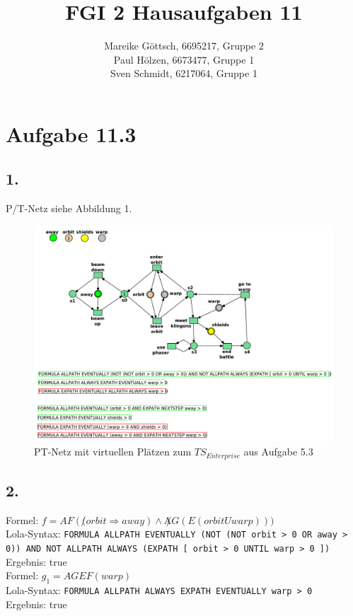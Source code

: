\documentclass[12pt, paper=a4]{article}
\author{Mareike G\"ottsch, 6695217, Gruppe 2\\Paul H\"olzen, 6673477, Gruppe 1\\Sven Schmidt, 6217064, Gruppe 1}
\title{FGI 2 Hausaufgaben 11}
\begin{document}
\maketitle

\section*{Aufgabe 11.3}
\subsection*{1.}
P/T-Netz siehe Abbildung 1.\\

\begin{figure}[h!]
\centering
\includegraphics[scale=0.7]{EnterprisePT.pdf}
\caption{PT-Netz mit virtuellen Plätzen zum $TS_{Enterprise}$ aus Aufgabe 5.3}
\end{figure}

\subsection*{2.}
Formel: $f = AF(\not(orbit \Rightarrow away) \land \not AG(E(orbit U warp)))$\\
Lola-Syntax: \texttt{FORMULA ALLPATH EVENTUALLY (NOT (NOT orbit > 0 OR away > 0)) AND NOT ALLPATH ALWAYS (EXPATH [ orbit > 0 UNTIL warp > 0 ])}\\
Ergebnis: true\\

Formel: $g_1 = AGEF(warp)$\\
Lola-Syntax: \texttt{FORMULA ALLPATH ALWAYS EXPATH EVENTUALLY warp > 0}\\
Ergebnis: true\\
\end{document}
